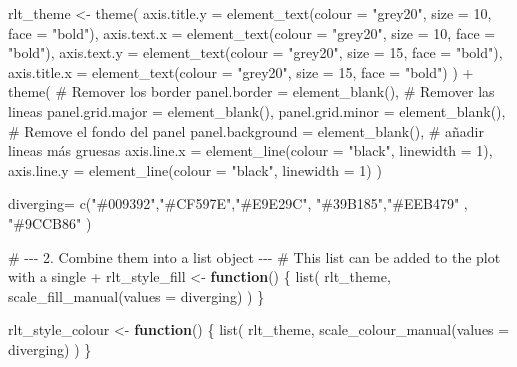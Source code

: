 \documentclass[
  12pt,
  letterpaper,
]{book}
\newenvironment{Shaded}{\begin{snugshade}}{\end{snugshade}}
\newcommand{\AttributeTok}[1]{\textcolor[rgb]{0.40,0.45,0.13}{#1}}
\newcommand{\CommentTok}[1]{\textcolor[rgb]{0.37,0.37,0.37}{#1}}
\newcommand{\ControlFlowTok}[1]{\textcolor[rgb]{0.00,0.23,0.31}{\textbf{#1}}}
\newcommand{\DecValTok}[1]{\textcolor[rgb]{0.68,0.00,0.00}{#1}}
\newcommand{\FunctionTok}[1]{\textcolor[rgb]{0.28,0.35,0.67}{#1}}
\newcommand{\NormalTok}[1]{\textcolor[rgb]{0.00,0.23,0.31}{#1}}
\newcommand{\OtherTok}[1]{\textcolor[rgb]{0.00,0.23,0.31}{#1}}
\newcommand{\SpecialCharTok}[1]{\textcolor[rgb]{0.37,0.37,0.37}{#1}}
\newcommand{\StringTok}[1]{\textcolor[rgb]{0.13,0.47,0.30}{#1}}
\begin{document}
\begin{Shaded}
\begin{Highlighting}[]
\NormalTok{rlt\_theme }\OtherTok{\textless{}{-}} \FunctionTok{theme}\NormalTok{(}
  \AttributeTok{axis.title.y =} \FunctionTok{element\_text}\NormalTok{(}\AttributeTok{colour =} \StringTok{"grey20"}\NormalTok{, }\AttributeTok{size =} \DecValTok{10}\NormalTok{, }\AttributeTok{face =} \StringTok{"bold"}\NormalTok{),}
  \AttributeTok{axis.text.x =} \FunctionTok{element\_text}\NormalTok{(}\AttributeTok{colour =} \StringTok{"grey20"}\NormalTok{, }\AttributeTok{size =} \DecValTok{10}\NormalTok{, }\AttributeTok{face =} \StringTok{"bold"}\NormalTok{),}
  \AttributeTok{axis.text.y =} \FunctionTok{element\_text}\NormalTok{(}\AttributeTok{colour =} \StringTok{"grey20"}\NormalTok{, }\AttributeTok{size =} \DecValTok{15}\NormalTok{, }\AttributeTok{face =} \StringTok{"bold"}\NormalTok{),}
  \AttributeTok{axis.title.x =} \FunctionTok{element\_text}\NormalTok{(}\AttributeTok{colour =} \StringTok{"grey20"}\NormalTok{, }\AttributeTok{size =} \DecValTok{15}\NormalTok{, }\AttributeTok{face =} \StringTok{"bold"}\NormalTok{)}
\NormalTok{) }\SpecialCharTok{+}
  \FunctionTok{theme}\NormalTok{(}
    \CommentTok{\# Remover los border}
    \AttributeTok{panel.border =} \FunctionTok{element\_blank}\NormalTok{(),}
    \CommentTok{\# Remover las lineas}
    \AttributeTok{panel.grid.major =} \FunctionTok{element\_blank}\NormalTok{(),}
    \AttributeTok{panel.grid.minor =} \FunctionTok{element\_blank}\NormalTok{(),}
    \CommentTok{\# Remove el fondo del panel}
    \AttributeTok{panel.background =} \FunctionTok{element\_blank}\NormalTok{(),}
    \CommentTok{\# añadir lineas más gruesas}
    \AttributeTok{axis.line.x =} \FunctionTok{element\_line}\NormalTok{(}\AttributeTok{colour =} \StringTok{"black"}\NormalTok{, }\AttributeTok{linewidth =} \DecValTok{1}\NormalTok{),}
    \AttributeTok{axis.line.y =} \FunctionTok{element\_line}\NormalTok{(}\AttributeTok{colour =} \StringTok{"black"}\NormalTok{, }\AttributeTok{linewidth =} \DecValTok{1}\NormalTok{)}
\NormalTok{  )}


\NormalTok{diverging}\OtherTok{=} \FunctionTok{c}\NormalTok{(}\StringTok{"\#009392"}\NormalTok{,}\StringTok{"\#CF597E"}\NormalTok{,}\StringTok{"\#E9E29C"}\NormalTok{, }\StringTok{"\#39B185"}\NormalTok{,}\StringTok{"\#EEB479"}\NormalTok{ , }\StringTok{"\#9CCB86"}\NormalTok{ )}


\CommentTok{\# {-}{-}{-} 2. Combine them into a list object {-}{-}{-}}
\CommentTok{\# This list can be added to the plot with a single \textquotesingle{}+\textquotesingle{}}
\NormalTok{rlt\_style\_fill }\OtherTok{\textless{}{-}} \ControlFlowTok{function}\NormalTok{() \{}
  \FunctionTok{list}\NormalTok{(}
\NormalTok{    rlt\_theme,}
    \FunctionTok{scale\_fill\_manual}\NormalTok{(}\AttributeTok{values =}\NormalTok{ diverging)}
\NormalTok{  )}
\NormalTok{\}}


\NormalTok{rlt\_style\_colour }\OtherTok{\textless{}{-}} \ControlFlowTok{function}\NormalTok{() \{}
  \FunctionTok{list}\NormalTok{(}
\NormalTok{    rlt\_theme,}
    \FunctionTok{scale\_colour\_manual}\NormalTok{(}\AttributeTok{values =}\NormalTok{ diverging)}
\NormalTok{  )}
\NormalTok{\}}
\end{Highlighting}
\end{Shaded}
\end{document}
